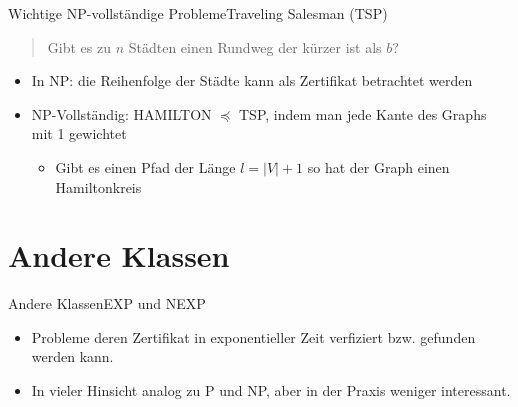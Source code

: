 \documentclass[ignorenonframetext,]{beamer}
\begin{document}
\begin{frame}{Wichtige NP-vollständige Probleme}{Traveling Salesman (TSP)}

\begin{quote}
Gibt es zu $n$ Städten einen Rundweg der kürzer ist als $b$?
\end{quote}

\begin{itemize}
\itemsep1pt\parskip0pt
\item
  In NP: die Reihenfolge der Städte kann als Zertifikat betrachtet
  werden
\item
  NP-Vollständig: HAMILTON $\preceq$ TSP, indem man jede Kante des
  Graphs mit 1 gewichtet

  \begin{itemize}
  \itemsep1pt\parskip0pt
  \item
    Gibt es einen Pfad der Länge $l = |V|+1$ so hat der Graph einen
    Hamiltonkreis
  \end{itemize}
\end{itemize}

\end{frame}

\section{Andere Klassen}\label{andere-klassen}

\begin{frame}{Andere Klassen}{EXP und NEXP}

\begin{itemize}
\itemsep1pt\parskip0pt
\item
  Probleme deren Zertifikat in exponentieller Zeit verfiziert bzw.
  gefunden werden kann.
\item
  In vieler Hinsicht analog zu P und NP, aber in der Praxis weniger
  interessant.
\end{itemize}

\end{frame}
\end{document}
